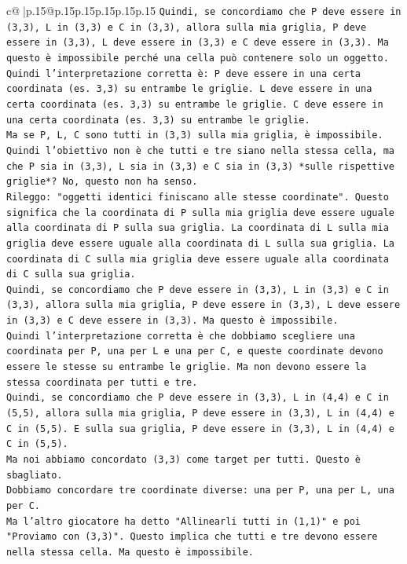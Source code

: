 \documentclass{article}
\begin{document}
{\begin{supertabular}{c@{$\;$}|p{.15\linewidth}@{}p{.15\linewidth}p{.15\linewidth}p{.15\linewidth}p{.15\linewidth}p{.15\linewidth}}
{{{\texttt{Quindi, se concordiamo che P deve essere in (3,3), L in (3,3) e C in (3,3), allora sulla mia griglia, P deve essere in (3,3), L deve essere in (3,3) e C deve essere in (3,3). Ma questo è impossibile perché una cella può contenere solo un oggetto.} \\
\texttt{Quindi l'interpretazione corretta è: P deve essere in una certa coordinata (es. 3,3) su entrambe le griglie. L deve essere in una certa coordinata (es. 3,3) su entrambe le griglie. C deve essere in una certa coordinata (es. 3,3) su entrambe le griglie.} \\
\texttt{Ma se P, L, C sono tutti in (3,3) sulla mia griglia, è impossibile.} \\
\texttt{Quindi l'obiettivo non è che tutti e tre siano nella stessa cella, ma che P sia in (3,3), L sia in (3,3) e C sia in (3,3) *sulle rispettive griglie*? No, questo non ha senso.} \\
\texttt{Rileggo: "oggetti identici finiscano alle stesse coordinate". Questo significa che la coordinata di P sulla mia griglia deve essere uguale alla coordinata di P sulla sua griglia. La coordinata di L sulla mia griglia deve essere uguale alla coordinata di L sulla sua griglia. La coordinata di C sulla mia griglia deve essere uguale alla coordinata di C sulla sua griglia.} \\
\texttt{Quindi, se concordiamo che P deve essere in (3,3), L in (3,3) e C in (3,3), allora sulla mia griglia, P deve essere in (3,3), L deve essere in (3,3) e C deve essere in (3,3). Ma questo è impossibile.} \\
\texttt{Quindi l'interpretazione corretta è che dobbiamo scegliere una coordinata per P, una per L e una per C, e queste coordinate devono essere le stesse su entrambe le griglie. Ma non devono essere la stessa coordinata per tutti e tre.} \\
\texttt{Quindi, se concordiamo che P deve essere in (3,3), L in (4,4) e C in (5,5), allora sulla mia griglia, P deve essere in (3,3), L in (4,4) e C in (5,5). E sulla sua griglia, P deve essere in (3,3), L in (4,4) e C in (5,5).} \\
\texttt{Ma noi abbiamo concordato (3,3) come target per tutti. Questo è sbagliato.} \\
\texttt{Dobbiamo concordare tre coordinate diverse: una per P, una per L, una per C.} \\
\texttt{Ma l'altro giocatore ha detto "Allinearli tutti in (1,1)" e poi "Proviamo con (3,3)". Questo implica che tutti e tre devono essere nella stessa cella. Ma questo è impossibile.} \\
}}}
\end{supertabular}}
\end{document}
